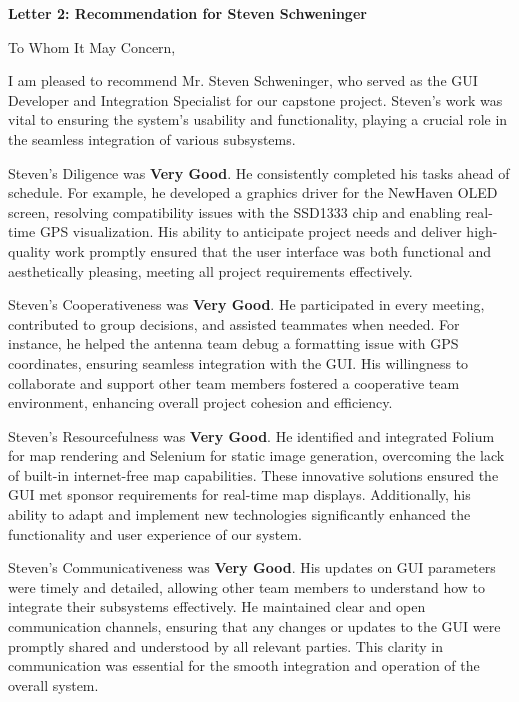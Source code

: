 \documentclass[11pt]{article}
\begin{document}
\begin{flushleft}
\textbf{Letter 2: Recommendation for Steven Schweninger}

\vspace{12pt}

To Whom It May Concern,

\vspace{12pt}

I am pleased to recommend Mr. Steven Schweninger, who served as the GUI Developer and Integration Specialist for our capstone project. Steven’s work was vital to ensuring the system’s usability and functionality, playing a crucial role in the seamless integration of various subsystems.

Steven’s Diligence was \textbf{Very Good}. He consistently completed his tasks ahead of schedule. For example, he developed a graphics driver for the NewHaven OLED screen, resolving compatibility issues with the SSD1333 chip and enabling real-time GPS visualization. His ability to anticipate project needs and deliver high-quality work promptly ensured that the user interface was both functional and aesthetically pleasing, meeting all project requirements effectively.

Steven’s Cooperativeness was \textbf{Very Good}. He participated in every meeting, contributed to group decisions, and assisted teammates when needed. For instance, he helped the antenna team debug a formatting issue with GPS coordinates, ensuring seamless integration with the GUI. His willingness to collaborate and support other team members fostered a cooperative team environment, enhancing overall project cohesion and efficiency.

Steven’s Resourcefulness was \textbf{Very Good}. He identified and integrated Folium for map rendering and Selenium for static image generation, overcoming the lack of built-in internet-free map capabilities. These innovative solutions ensured the GUI met sponsor requirements for real-time map displays. Additionally, his ability to adapt and implement new technologies significantly enhanced the functionality and user experience of our system.

Steven’s Communicativeness was \textbf{Very Good}. His updates on GUI parameters were timely and detailed, allowing other team members to understand how to integrate their subsystems effectively. He maintained clear and open communication channels, ensuring that any changes or updates to the GUI were promptly shared and understood by all relevant parties. This clarity in communication was essential for the smooth integration and operation of the overall system.


\end{flushleft}
\end{document}
